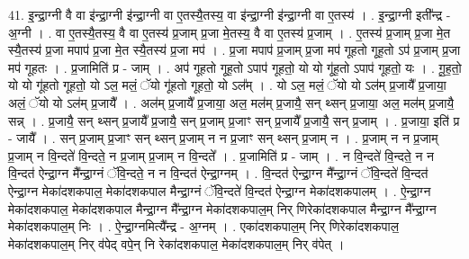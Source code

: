 \documentclass[17pt]{extarticle}
\begin{document}
41. इ॒न्द्रा॒ग्नी वै वा इ॑न्द्रा॒ग्नी इ॑न्द्रा॒ग्नी वा ए॒तस्यै॒तस्य॒ वा इ॑न्द्रा॒ग्नी इ॑न्द्रा॒ग्नी वा ए॒तस्य॑ । . इ॒न्द्रा॒ग्नी इती᳚न्द्र - अ॒ग्नी । . वा ए॒तस्यै॒तस्य॒ वै वा ए॒तस्य॑ प्र॒जाम् प्र॒जा मे॒तस्य॒ वै वा ए॒तस्य॑ प्र॒जाम् । . ए॒तस्य॑ प्र॒जाम् प्र॒जा मे॒त स्यै॒तस्य॑ प्र॒जा मपाप॑ प्र॒जा मे॒त स्यै॒तस्य॑ प्र॒जा मप॑ । . प्र॒जा मपाप॑ प्र॒जाम् प्र॒जा मप॑ गूहतो गूह॒तो ऽप॑ प्र॒जाम् प्र॒जा मप॑ गूहतः । . प्र॒जामिति॑ प्र - जाम् । . अप॑ गूहतो गूह॒तो ऽपाप॑ गूहतो॒ यो यो गू॑ह॒तो ऽपाप॑ गूहतो॒ यः । . गू॒ह॒तो॒ यो यो गू॑हतो गूहतो॒ यो ऽल॒ मलं॒ ॅयो गू॑हतो गूहतो॒ यो ऽल᳚म् । . यो ऽल॒ मलं॒ ॅयो यो ऽल॑म् प्र॒जायै᳚ प्र॒जाया॒ अलं॒ ॅयो यो ऽल॑म् प्र॒जायै᳚ । . अल॑म् प्र॒जायै᳚ प्र॒जाया॒ अल॒ मल॑म् प्र॒जायै॒ सन् थ्सन् प्र॒जाया॒ अल॒ मल॑म् प्र॒जायै॒ सन्न् । . प्र॒जायै॒ सन् थ्सन् प्र॒जायै᳚ प्र॒जायै॒ सन् प्र॒जाम् प्र॒जाꣳ सन् प्र॒जायै᳚ प्र॒जायै॒ सन् प्र॒जाम् । . प्र॒जाया॒ इति॑ प्र - जायै᳚ । . सन् प्र॒जाम् प्र॒जाꣳ सन् थ्सन् प्र॒जाम् न न प्र॒जाꣳ सन् थ्सन् प्र॒जाम् न । . प्र॒जाम् न न प्र॒जाम् प्र॒जाम् न वि॒न्दते॑ वि॒न्दते॒ न प्र॒जाम् प्र॒जाम् न वि॒न्दते᳚ । . प्र॒जामिति॑ प्र - जाम् । . न वि॒न्दते॑ वि॒न्दते॒ न न वि॒न्दत॑ ऐन्द्रा॒ग्न मै᳚न्द्रा॒ग्नं ॅवि॒न्दते॒ न न वि॒न्दत॑ ऐन्द्रा॒ग्नम् । . वि॒न्दत॑ ऐन्द्रा॒ग्न मै᳚न्द्रा॒ग्नं ॅवि॒न्दते॑ वि॒न्दत॑ ऐन्द्रा॒ग्न मेका॑दशकपाल॒ मेका॑दशकपाल मैन्द्रा॒ग्नं ॅवि॒न्दते॑ वि॒न्दत॑ ऐन्द्रा॒ग्न मेका॑दशकपालम् । . ऐ॒न्द्रा॒ग्न मेका॑दशकपाल॒ मेका॑दशकपाल मैन्द्रा॒ग्न मै᳚न्द्रा॒ग्न मेका॑दशकपाल॒म् निर् णिरेका॑दशकपाल मैन्द्रा॒ग्न मै᳚न्द्रा॒ग्न मेका॑दशकपाल॒म् निः । . ऐ॒न्द्रा॒ग्नमित्यै᳚न्द्र - अ॒ग्नम् । . एका॑दशकपाल॒म् निर् णिरेका॑दशकपाल॒ मेका॑दशकपाल॒म् निर् व॑पेद् वपे॒न् नि रेका॑दशकपाल॒ मेका॑दशकपाल॒म् निर् व॑पेत् । \newline
\end{document}
